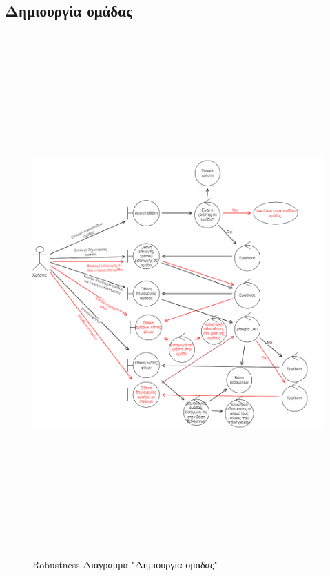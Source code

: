 \subsection{Δημιουργία ομάδας}

\begin{figure}[!htb]
  \begin{center}
    \includegraphics[width=18cm,height=20cm]{robust_dhmiourgia.png}
    \caption{Robustness Διάγραμμα "Δημιουργία ομάδας"}
    \label{}
     \end{center}
\end{figure}
\newpage


